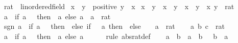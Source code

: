\begin{isabellebody}
\endisatagproof
{\isafoldproof}%
%
\isadelimproof
\isanewline
%
\endisadelimproof
\isanewline
{}\isamarkupfalse%
\ rat\ {\isacharcolon}{\kern0pt}{\isacharcolon}{\kern0pt}\ linordered{\isacharunderscore}{\kern0pt}field\isanewline
{}\isanewline
\isanewline
{}\isamarkupfalse%
\ {\isachardoublequoteopen}x\ {\isacharless}{\kern0pt}\ y\ {\isasymlongleftrightarrow}\ positive\ {\isacharparenleft}{\kern0pt}y\ {\isacharminus}{\kern0pt}\ x{\isacharparenright}{\kern0pt}{\isachardoublequoteclose}\isanewline
\isanewline
{}\isamarkupfalse%
\ {\isachardoublequoteopen}x\ {\isasymle}\ y\ {\isasymlongleftrightarrow}\ x\ {\isacharless}{\kern0pt}\ y\ {\isasymor}\ x\ {\isacharequal}{\kern0pt}\ y{\isachardoublequoteclose}\ \ x\ y\ {\isacharcolon}{\kern0pt}{\isacharcolon}{\kern0pt}\ rat\isanewline
\isanewline
{}\isamarkupfalse%
\ {\isachardoublequoteopen}{\isasymbar}a{\isasymbar}\ {\isacharequal}{\kern0pt}\ {\isacharparenleft}{\kern0pt}if\ a\ {\isacharless}{\kern0pt}\ {}\ then\ {\isacharminus}{\kern0pt}\ a\ else\ a{\isacharparenright}{\kern0pt}{\isachardoublequoteclose}\ \ a\ {\isacharcolon}{\kern0pt}{\isacharcolon}{\kern0pt}\ rat\isanewline
\isanewline
{}\isamarkupfalse%
\ {\isachardoublequoteopen}sgn\ a\ {\isacharequal}{\kern0pt}\ {\isacharparenleft}{\kern0pt}if\ a\ {\isacharequal}{\kern0pt}\ {}\ then\ {}\ else\ if\ {}\ {\isacharless}{\kern0pt}\ a\ then\ {}\ else\ {\isacharminus}{\kern0pt}\ {}{\isacharparenright}{\kern0pt}{\isachardoublequoteclose}\ \ a\ {\isacharcolon}{\kern0pt}{\isacharcolon}{\kern0pt}\ rat\isanewline
\isanewline
{}\isamarkupfalse%
\isanewline
%
\isadelimproof
%
\endisadelimproof
%
\isatagproof
{}\isamarkupfalse%
\isanewline
\ \ \isamarkupfalse%
\ a\ b\ c\ {\isacharcolon}{\kern0pt}{\isacharcolon}{\kern0pt}\ rat\isanewline
\ \ \isamarkupfalse%
\ {\isachardoublequoteopen}{\isasymbar}a{\isasymbar}\ {\isacharequal}{\kern0pt}\ {\isacharparenleft}{\kern0pt}if\ a\ {\isacharless}{\kern0pt}\ {}\ then\ {\isacharminus}{\kern0pt}\ a\ else\ a{\isacharparenright}{\kern0pt}{\isachardoublequoteclose}\isanewline
\ \ \ \ \isamarkupfalse%
\ {\isacharparenleft}{\kern0pt}rule\ abs{\isacharunderscore}{\kern0pt}rat{\isacharunderscore}{\kern0pt}def{\isacharparenright}{\kern0pt}\isanewline
\ \ \isamarkupfalse%
\ {\isachardoublequoteopen}a\ {\isacharless}{\kern0pt}\ b\ {\isasymlongleftrightarrow}\ a\ {\isasymle}\ b\ {\isasymand}\ {\isasymnot}\ b\ {\isasymle}\ a{\isachardoublequoteclose}\isanewline

\end{isabellebody}
